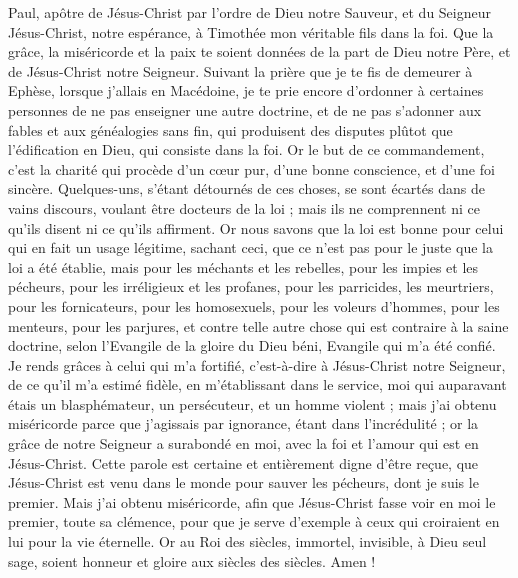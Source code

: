 \begin{multicols}{2}
\VerseOne{}Paul, apôtre de Jésus-Christ par l'ordre de Dieu notre Sauveur, et du Seigneur Jésus-Christ, notre espérance,
à Timothée mon véritable fils dans la foi. Que la grâce, la miséricorde et la paix te soient données de la part de Dieu notre Père, et de Jésus-Christ notre Seigneur.
Suivant la prière que je te fis de demeurer à Ephèse, lorsque j'allais en Macédoine, je te prie encore d'ordonner à certaines personnes de ne pas enseigner une autre doctrine,
et de ne pas s'adonner aux fables et aux généalogies sans fin, qui produisent des disputes plûtot que l'édification en Dieu, qui consiste dans la foi.
Or le but de ce commandement, c'est la charité qui procède d'un cœur pur, d'une bonne conscience, et d'une foi sincère.
Quelques-uns, s'étant détournés de ces choses, se sont écartés dans de vains discours,
voulant être docteurs de la loi ; mais ils ne comprennent ni ce qu'ils disent ni ce qu'ils affirment.
Or nous savons que la loi est bonne pour celui qui en fait un usage légitime,
sachant ceci, que ce n'est pas pour le juste que la loi a été établie, mais pour les méchants et les rebelles, pour les impies et les pécheurs, pour les irréligieux et les profanes, pour les parricides, les meurtriers,
pour les fornicateurs, pour les homosexuels, pour les voleurs d'hommes, pour les menteurs, pour les parjures, et contre telle autre chose qui est contraire à la saine doctrine,
selon l'Evangile de la gloire du Dieu béni, Evangile qui m'a été confié.
Je rends grâces à celui qui m'a fortifié, c'est-à-dire à Jésus-Christ notre Seigneur, de ce qu'il m'a estimé fidèle, en m'établissant dans le service,
moi qui auparavant étais un blasphémateur, un persécuteur, et un homme violent ; mais j'ai obtenu miséricorde parce que j'agissais par ignorance, étant dans l'incrédulité ;
or la grâce de notre Seigneur a surabondé en moi, avec la foi et l'amour qui est en Jésus-Christ.
Cette parole est certaine et entièrement digne d'être reçue, que Jésus-Christ est venu dans le monde pour sauver les pécheurs, dont je suis le premier.
Mais j'ai obtenu miséricorde, afin que Jésus-Christ fasse voir en moi le premier, toute sa clémence, pour que je serve d'exemple à ceux qui croiraient en lui pour la vie éternelle.
Or au Roi des siècles, immortel, invisible, à Dieu seul sage, soient honneur et gloire aux siècles des siècles. Amen !

\end{multicols}
